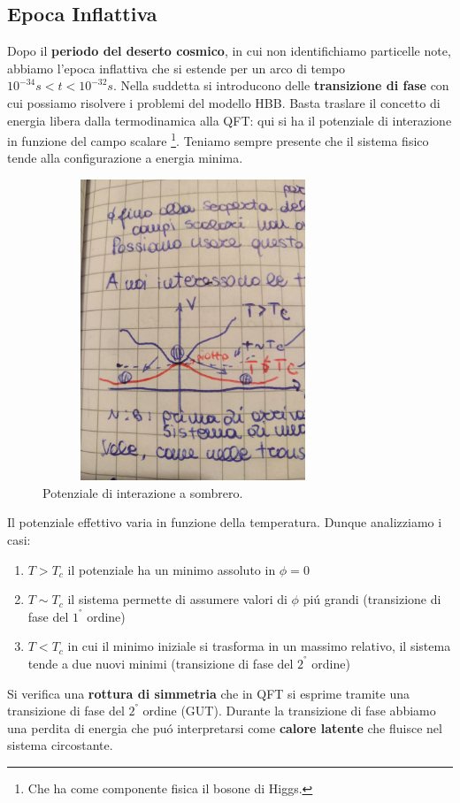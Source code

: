 \documentclass[12pt, a4paper]{article}
\begin{document}
\subsection{Epoca Inflattiva}
Dopo il \textbf{periodo del deserto cosmico}, in cui non identifichiamo particelle note, abbiamo l'epoca inflattiva che si estende per un arco di tempo $10^{-34}s<t<10^{-32} s$. Nella suddetta si introducono delle \textbf{transizione di fase} con cui possiamo risolvere i problemi del modello HBB. Basta traslare il concetto di energia libera dalla termodinamica alla QFT: qui si ha il potenziale di interazione in funzione del campo scalare \footnote{Che ha come componente fisica il bosone di Higgs.}. Teniamo sempre presente che il sistema fisico tende alla configurazione a energia minima.
\begin{figure}[htp]
    \centering
    \includegraphics[width=9cm, height=9cm]{images/sombrero.jpeg}
    \caption{Potenziale di interazione a sombrero.}
    \label{fig:sombrero}
\end{figure}
Il potenziale effettivo varia in funzione della temperatura. Dunque analizziamo i casi:
\begin{enumerate}
\item $T>T_c$ il potenziale ha un minimo assoluto in $\phi=0$
\item $T \sim T_c$  il sistema permette di assumere valori di $\phi$ pi\'{u} grandi (transizione di fase del $1^°$ ordine)
\item $T<T_c$ in cui il minimo iniziale si trasforma in un massimo relativo, il sistema tende a due nuovi minimi (transizione di fase del $2^°$ ordine)
\end{enumerate}
Si verifica una \textbf{rottura di simmetria} che in QFT si esprime tramite una transizione di fase del $2^°$ ordine (GUT). Durante la transizione di fase abbiamo una perdita di energia che pu\'{o} interpretarsi come \textbf{calore latente} che fluisce nel sistema circostante.
\end{document}
